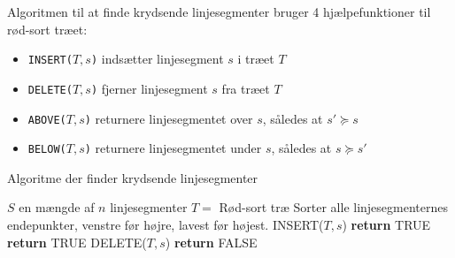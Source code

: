 Algoritmen til at finde krydsende linjesegmenter bruger 4 hjælpefunktioner til rød-sort træet:
\begin{itemize}
\item \texttt{INSERT($T,s$)} indsætter linjesegment $s$ i træet $T$
\item \texttt{DELETE($T,s$)} fjerner linjesegment $s$ fra træet $T$
\item \texttt{ABOVE($T,s$)} returnere linjesegmentet over $s$, således at $s' \succeq s$
\item \texttt{BELOW($T,s$)} returnere linjesegmentet under $s$, således at $s \succeq s'$
\end{itemize}

\begin{algorithm}[H]
  \caption{Algoritme der finder krydsende linjesegmenter}
  \begin{algorithmic}[1]
    \State $S$ en mængde af $n$ linjesegmenter
    \State $T =$ Rød-sort træ
    \State Sorter alle linjesegmenternes endepunkter, venstre før højre, lavest før højest.
    \State INSERT($T,s$)
    \State \textbf{return} TRUE 
    \EndIf
    \EndIf
    \State \textbf{return} TRUE
    \EndIf
    \State DELETE($T,s$)
    \EndIf
    \EndFor
    \State \textbf{return} FALSE
    \EndFunction
  \end{algorithmic}
\end{algorithm}

